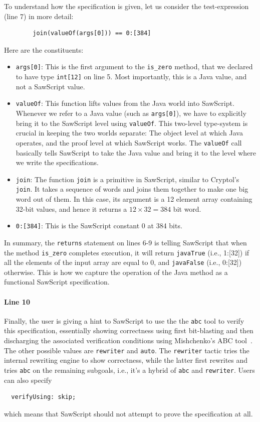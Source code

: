 \documentclass[12pt]{galois-whitepaper}
\newcommand{\sawScript}{{\sc SawScript}\xspace}
\begin{document}
To understand how the specification is given, let us consider the test-expression (line 7) in more detail:

\begin{verbatim}
        join(valueOf(args[0])) == 0:[384]
\end{verbatim}

Here are the constituents:
\begin{itemize}
\item {\tt args[0]}: This is the first argument to the {\tt is\_zero} method, that we declared to have type {\tt int[12]} on line 5. Most importantly,
this is a Java value, and not a \sawScript value.
\item {\tt valueOf}: This function lifts values from the Java world into \sawScript. 
Whenever we refer to a Java value (such as {\tt args[0]}), we have to
explicitly bring it to the \sawScript level using {\tt valueOf}. This two-level type-system is crucial in keeping the two worlds separate: The object level at which
Java operates, and the proof level at which \sawScript works. The {\tt valueOf} call basically tells \sawScript to take the Java value and bring it to the
level where we write the specifications.
\item {\tt join}: The function {\tt join} is a primitive in \sawScript, similar to Cryptol's {\tt join}. It takes a sequence of words and joins them
together to make one big word out of them. In this case, its argument is a 12 element array containing 32-bit values, and hence it returns a $12\times32 = 384$
bit word.
\item {\tt 0:[384]}: This is the \sawScript constant 0 at 384 bits.
\end{itemize}

In summary, the {\tt returns} statement on lines 6-9 is telling \sawScript that when the method {\tt is\_zero} completes execution, it will return
{\tt javaTrue} (i.e., 1:[32]) if all the elements of the input array are equal to 0, and {\tt javaFalse} (i.e., 0:[32]) otherwise. This is how we capture
the operation of the Java method as a functional \sawScript specification.

\paragraph{Line 10} Finally, the user is giving a hint to \sawScript to use the the {\tt abc} tool to verify this specification, essentially showing
correctness using first bit-blasting and then discharging the associated verification conditions
using Mishchenko's  ABC tool~\cite{ABC}. The other possible values are {\tt rewriter} and {\tt auto}.
The {\tt rewriter} tactic tries the internal rewriting engine to show correctness, while the latter first rewrites and tries {\tt abc} on the remaining subgoals, 
i.e., it's a hybrid of {\tt abc} and {\tt rewriter}. Users can also specify
\begin{Verbatim}
  verifyUsing: skip;
\end{Verbatim}
which means that \sawScript should not attempt to prove the specification at all.
\end{document}
